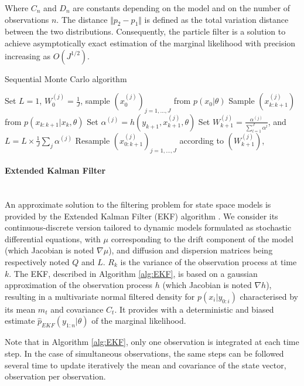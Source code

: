 \documentclass[a4paper,11pt,titlepage]{article}
\theoremstyle{plain} %
\begin{document}
Where $C_n$ and $D_n$ are constants depending on the model and on the number of observations $n$. The distance $\Vert p_2-p_1 \Vert$  is defined as the total variation distance between the two distributions. Consequently, the particle filter is a solution to achieve asymptotically exact estimation of
the  marginal likelihood with precision increasing as $O(J^{1/2})$. 
\begin{algorithm}
\caption{Sequential Monte Carlo algorithm}
\label{alg:SMC}
{\fontsize{12}{20}\selectfont
\begin{algorithmic}
\STATE Set $L=1$, $W_{0}^{(j)}=\frac{1}{J}$, sample $(x_{0}^{(j)})_{j=1,...,J}$ from $p(x_0|\theta)$ 
		\STATE Sample $(x_{k:k+1}^{(j)})$ from $p(x_{k:k+1}|x_k,\theta)$  
		\STATE Set $\alpha^{(j)}= h(y_{k+1},x^{(j)}_{k+1},\theta)$
	\ENDFOR
	\STATE Set $W_{k+1}^{(j)}=\frac{\alpha^{(j)}}{\sum_{l=1}^{J}\alpha^{l}}$, and $L=L\times \frac{1}{J} \sum_j \alpha^{(j)}$
	\STATE Resample $(x_{0:k+1}^{(j)})_{j=1,\dots,J}$ according to $(W_{k+1}^{(j)})$,
\ENDFOR		
\end{algorithmic}
}
\end{algorithm}




\paragraph{Extended Kalman Filter}\mbox{}\\
An approximate solution to the filtering problem for state space models is provided by the Extended Kalman Filter (EKF) algorithm \citep{Jazwinski1970,Sarkka2006}. We consider its continuous-discrete version tailored  to dynamic models formulated as stochastic differential equations, with $\mu$  corresponding to the drift component of the model (which Jacobian is noted $\nabla\mu$), and diffusion and dispersion matrices being respectively noted $Q$ and $L$. $R_k$ is the variance of the observation process at time $k$. The EKF, described in Algorithm \ref{alg:EKF},  is based on a gaussian approximation of the observation process $h$ (which Jacobian is noted $\nabla h$), resulting in a multivariate normal filtered density for $p(x_i|y_{0:i})$ characterised by its mean $m_t$ and covariance $C_t$. It provides with a deterministic and biased estimate $\hat{p}_{EKF}(y_{1:n}|\theta)$ of the marginal likelihood.


Note that in Algorithm \ref{alg:EKF},  only one observation is integrated at each time step. In the case of simultaneous observations, the same steps can be followed several time to update iteratively the mean and covariance of the state vector, observation per observation.
\end{document}
